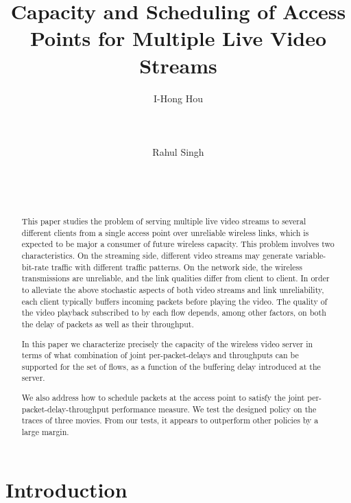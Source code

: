 \documentclass[10pt,nocopyrightspace]{sigplan-proc-varsize-1in}
\begin{document}
\title{Capacity and Scheduling of Access Points for Multiple Live Video Streams}
\author{
\alignauthor
I-Hong Hou\\
\\
\\
\\
\alignauthor
Rahul Singh\\
\\
\\
\\
}
\maketitle
\begin{abstract}
This paper studies the problem of serving multiple live video streams to several different clients from a single access point over unreliable wireless links, which is expected to be major a consumer of future wireless capacity. This problem involves two characteristics. On the streaming side, different video streams may generate variable-bit-rate traffic with different traffic patterns. On the network side, the wireless transmissions are unreliable, and the link qualities differ from client to client. In order to alleviate the above stochastic aspects of both video streams and link unreliability, each client typically buffers incoming packets before playing the video. The quality of the video playback subscribed to by each flow depends, among other factors, on both the delay of packets as well as their throughput.

In this paper we characterize precisely the capacity of the wireless video server in terms of what combination of joint per-packet-delays and throughputs can be supported for the set of flows, as a function of the buffering delay introduced at the server.  

We also address how to schedule packets at the access point to satisfy the joint per-packet-delay-throughput performance measure. We test the designed policy on the traces of three movies. From our tests, it appears to outperform other policies by a large margin.

\end{abstract}

\section{Introduction}  \label{section:introduction}
\end{document}
